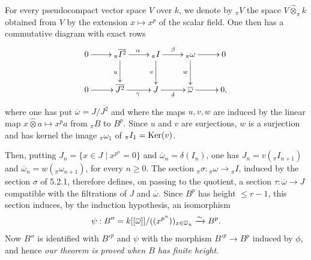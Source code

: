 For every pseudocompact vector space $V$ over $k$, we denote by ${}_\pi V$ the space $V\widehat\otimes_\pi k$ obtained from $V$ by the extension $x\mapsto x^p$ of the scalar field. One then has a commutative diagram with exact rows
\[
\xymatrix@C=24pt@R=25pt{
0\ar[r]&{}_\pi\overline{I^2}\ar[r]^\alpha\ar[d]_u&{}_\pi I\ar[r]^\beta\ar[d]_v&{}_\pi\omega\ar[r]\ar[d]_w&0\\
0\ar[r]&\overline{J^2}\ar[r]_\gamma&J\ar[r]_\delta&\overline\omega\ar[r]&0,}
\]
where one has put $\overline\omega=J/\overline{J^2}$ and where the maps $u,v,w$ are induced by the linear map $x\widehat\otimes a\mapsto x^pa$ from ${}_\pi B$ to $B^p$. Since $u$ and $v$ are surjections, $w$ is a surjection and has kernel the image ${}_\pi\omega_1$ of ${}_\pi I_1=\operatorname{Ker}(v)$.

Then, putting $J_n=\{x\in J\mid x^{p^n}=0\}$ and $\overline\omega_n=\delta(I_n)$, one has $J_n=v({}_\pi I_{n+1})$ and $\overline\omega_n=w({}_\pi\omega_{n+1})$, for every $n\ge0$. The section ${}_\pi\sigma:{}_\pi\omega\to{}_\pi I$, induced by the section $\sigma$ of 5.2.1, therefore defines, on passing to the quotient, a section $\tau:\overline\omega\to J$ compatible with the filtrations of $J$ and $\overline\omega$. Since $B^p$ has height $\le r-1$, this section induces, by the induction hypothesis, an isomorphism
\[
\psi:B''=k[[\overline\omega]]/((x^{p^n}))_{x\in\overline\omega_n}\xrightarrow{\sim} B^p.
\]
Now $B''$ is identified with $B'^p$ and $\psi$ with the morphism $B'^p\to B^p$ induced by $\phi$, and hence \emph{our theorem is proved when $B$ has finite height}.

